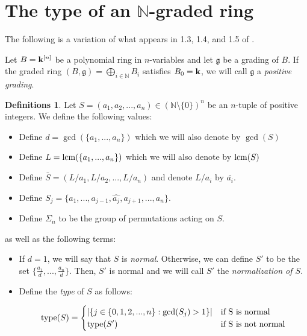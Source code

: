 \documentclass[12pt]{amsart}
\theoremstyle{plain}
\theoremstyle{definition}
\newtheorem{definitions}[subsection]{Definitions}
\newcommand{\lcm}{		\operatorname{{\rm lcm}}}
\newcommand{\type}{		\operatorname{{\rm type}}}
\newcommand{\Nat}{\ensuremath{\mathbb{N}}}
\newcommand{\bk}{{\ensuremath{\rm \bf k}}}
\newcommand{\ggoth}{\mathfrak{g}}
\begin{document}
\section{The type of an $\Nat$-graded ring}

The following is a variation of what appears in 1.3, 1.4, and 1.5 of \cite{Daigle2007}.   

Let $B = \bk^{[n]}$ be a polynomial ring in $n$-variables and let $\ggoth$ be a grading of $B$. If the graded ring $(B, \ggoth) = \bigoplus\limits_{i \in \Nat} B_i$ satisfies $B_0 = \bk$, we will call $\ggoth$ a \textit{positive grading}. 
	
\begin{definitions}	
	Let $S = (a_1, a_2, ..., a_n) \in (\Nat \setminus\{0\})^n$ be an $n$-tuple of positive integers. We define the following values:
	
	\begin{itemize}
		\item Define $d = \gcd(\{a_1,...,a_n\})$ which we will also denote by $\gcd(S)$ 
		\item Define $L = \lcm(\{a_1, ..., a_n\})$ which we will also denote by $\lcm(S)$
		\item Define $\bar{S} = (L/a_1, L/a_2,..., L/a_n)$ and denote $L/a_i$ by $\bar{a_i}$. 
		\item Define $S_j = \{a_1, ..., a_{j-1}, \hat{a_j}, a_{j+1}, ..., a_n\}$.
		
		\item Define $\Sigma_n$ to be the group of permutations acting on $S$.  
	\end{itemize}

	as well as the following terms:
	
	\begin{itemize}
		\item If $d = 1$, we will say that $S$ is \textit{normal}. Otherwise, we can define $S'$ to be the set $\{\frac{a_1}{d}, ... , \frac{a_n}{d}\}$. Then, $S'$ is normal and we will call $S'$ the \textit{normalization of $S$}.
		
		
		
		\item Define the \textit{type} of $S$ as follows:
		
		\begin{equation}
		\type(S) = 
		\begin{cases}
		|\{j \in \{0,1,2,...,n\} : \gcd(S_j) > 1\}| & \text{if S is normal}\\
		\type(S') & \text{if S is not normal}
		\end{cases}
		\end{equation}
	\end{itemize}  

	  	
\end{definitions}
\end{document}
